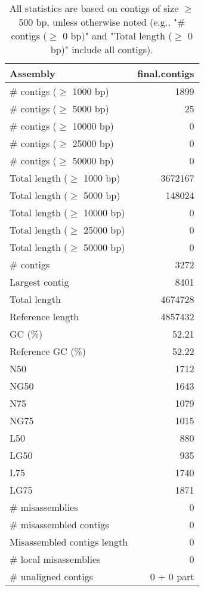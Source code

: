 \documentclass[12pt,a4paper]{article}
\begin{document}
\begin{table}[ht]
\begin{center}
\caption{All statistics are based on contigs of size $\geq$ 500 bp, unless otherwise noted (e.g., "\# contigs ($\geq$ 0 bp)" and "Total length ($\geq$ 0 bp)" include all contigs).}
\begin{tabular}{|l*{1}{|r}|}
\hline
Assembly & final.contigs \\ \hline
\# contigs ($\geq$ 1000 bp) & 1899 \\ \hline
\# contigs ($\geq$ 5000 bp) & 25 \\ \hline
\# contigs ($\geq$ 10000 bp) & 0 \\ \hline
\# contigs ($\geq$ 25000 bp) & 0 \\ \hline
\# contigs ($\geq$ 50000 bp) & 0 \\ \hline
Total length ($\geq$ 1000 bp) & 3672167 \\ \hline
Total length ($\geq$ 5000 bp) & 148024 \\ \hline
Total length ($\geq$ 10000 bp) & 0 \\ \hline
Total length ($\geq$ 25000 bp) & 0 \\ \hline
Total length ($\geq$ 50000 bp) & 0 \\ \hline
\# contigs & 3272 \\ \hline
Largest contig & 8401 \\ \hline
Total length & 4674728 \\ \hline
Reference length & 4857432 \\ \hline
GC (\%) & 52.21 \\ \hline
Reference GC (\%) & 52.22 \\ \hline
N50 & 1712 \\ \hline
NG50 & 1643 \\ \hline
N75 & 1079 \\ \hline
NG75 & 1015 \\ \hline
L50 & 880 \\ \hline
LG50 & 935 \\ \hline
L75 & 1740 \\ \hline
LG75 & 1871 \\ \hline
\# misassemblies & 0 \\ \hline
\# misassembled contigs & 0 \\ \hline
Misassembled contigs length & 0 \\ \hline
\# local misassemblies & 0 \\ \hline
\# unaligned contigs & 0 + 0 part \\ \hline

\end{tabular}
\end{center}
\end{table}
\end{document}
